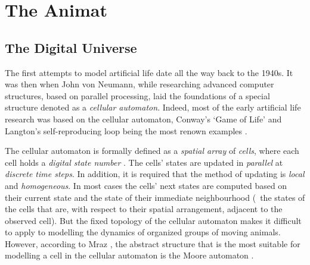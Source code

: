 









\chapter{The Animat}
\label{ch:animat}


\section{The Digital Universe}
The first attempts to model artificial life date all the way back to the 1940s. It was then when John von Neumann, while researching advanced computer structures, based on parallel processing, laid the foundations of a special structure denoted as a \emph{cellular automaton}. Indeed, most of the early artificial life research was based on the cellular automaton, Conway's `Game of Life' \cite{gardner:1970} and Langton's self-reproducing loop \cite{langton:1984} being the most renown examples \cite{adami:1998,emmenche:1994,rucker:1993}.

The cellular automaton is formally defined as a \emph{spatial array} of \emph{cells}, where each cell holds a \emph{digital state number} \cite{rucker:1993}. The cells' states are updated in \emph{parallel} at \emph{discrete time steps}. In addition, it is required that the method of updating is \emph{local} and \emph{homogeneous}. In most cases the cells' next states are computed based on their current state and the state of their immediate neighbourhood (\ie\ the states of the cells that are, with respect to their spatial arrangement, adjacent to the observed cell). But the fixed topology of the cellular automaton makes it difficult to apply to modelling the dynamics of organized groups of moving animals. However, according to Mraz \cite{mraz:2000}, the abstract structure that is the most suitable for modelling a cell in the cellular automaton is the Moore automaton \cite{kohavi:1978}.

